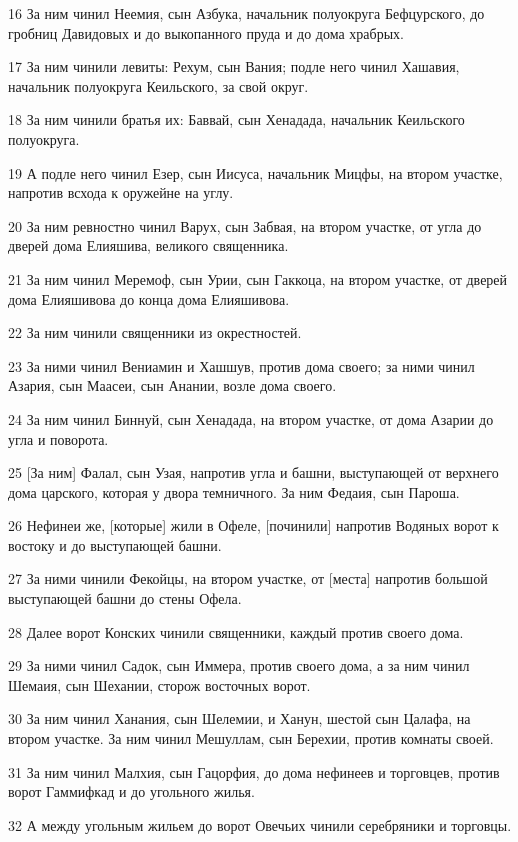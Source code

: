 \par 16 За ним чинил Неемия, сын Азбука, начальник полуокруга Бефцурского, до гробниц Давидовых и до выкопанного пруда и до дома храбрых.
\par 17 За ним чинили левиты: Рехум, сын Вания; подле него чинил Хашавия, начальник полуокруга Кеильского, за свой округ.
\par 18 За ним чинили братья их: Баввай, сын Хенадада, начальник Кеильского полуокруга.
\par 19 А подле него чинил Езер, сын Иисуса, начальник Мицфы, на втором участке, напротив всхода к оружейне на углу.
\par 20 За ним ревностно чинил Варух, сын Забвая, на втором участке, от угла до дверей дома Елияшива, великого священника.
\par 21 За ним чинил Меремоф, сын Урии, сын Гаккоца, на втором участке, от дверей дома Елияшивова до конца дома Елияшивова.
\par 22 За ним чинили священники из окрестностей.
\par 23 За ними чинил Вениамин и Хашшув, против дома своего; за ними чинил Азария, сын Маасеи, сын Анании, возле дома своего.
\par 24 За ним чинил Биннуй, сын Хенадада, на втором участке, от дома Азарии до угла и поворота.
\par 25 [За ним] Фалал, сын Узая, напротив угла и башни, выступающей от верхнего дома царского, которая у двора темничного. За ним Федаия, сын Пароша.
\par 26 Нефинеи же, [которые] жили в Офеле, [починили] напротив Водяных ворот к востоку и до выступающей башни.
\par 27 За ними чинили Фекойцы, на втором участке, от [места] напротив большой выступающей башни до стены Офела.
\par 28 Далее ворот Конских чинили священники, каждый против своего дома.
\par 29 За ними чинил Садок, сын Иммера, против своего дома, а за ним чинил Шемаия, сын Шехании, сторож восточных ворот.
\par 30 За ним чинил Ханания, сын Шелемии, и Ханун, шестой сын Цалафа, на втором участке. За ним чинил Мешуллам, сын Берехии, против комнаты своей.
\par 31 За ним чинил Малхия, сын Гацорфия, до дома нефинеев и торговцев, против ворот Гаммифкад и до угольного жилья.
\par 32 А между угольным жильем до ворот Овечьих чинили серебряники и торговцы.

